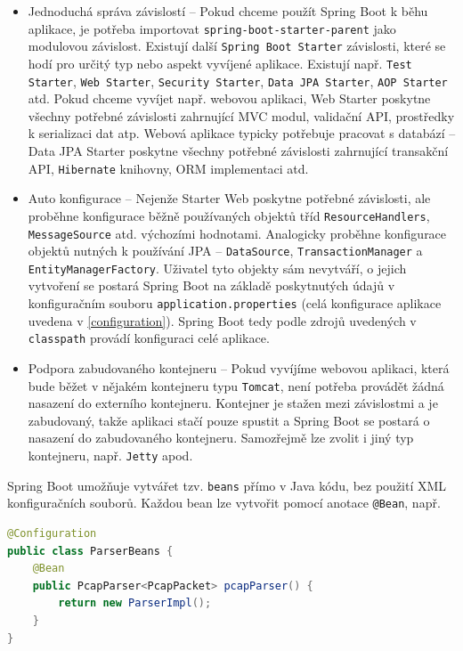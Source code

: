 \begin{itemize}
    \item Jednoduchá správa závislostí -- Pokud chceme použít Spring Boot k běhu aplikace, je potřeba importovat \texttt{spring-boot-starter-parent} jako modulovou závislost. Existují další \texttt{Spring Boot Starter} závislosti, které se hodí pro určitý typ nebo aspekt vyvíjené aplikace. Existují např. \texttt{Test Starter}, \texttt{Web Starter}, \texttt{Security Starter}, \texttt{Data JPA Starter}, \texttt{AOP Starter} atd. Pokud chceme vyvíjet např. webovou aplikaci, Web Starter poskytne všechny potřebné závislosti zahrnující MVC modul, validační API, prostředky k serializaci dat atp. Webová aplikace typicky potřebuje pracovat s databází -- Data JPA Starter poskytne všechny potřebné závislosti zahrnující transakční API, \texttt{Hibernate} knihovny, ORM implementaci atd.
    
    \item Auto konfigurace -- Nejenže Starter Web poskytne potřebné závislosti, ale proběhne konfigurace běžně používaných objektů tříd \texttt{ResourceHandlers}, \texttt{MessageSource} atd. výchozími hodnotami. Analogicky proběhne konfigurace objektů nutných k používání JPA -- \texttt{DataSource}, \texttt{TransactionManager} a \texttt{EntityManagerFactory}. Uživatel tyto objekty sám nevytváří, o jejich vytvoření se postará Spring Boot na základě poskytnutých údajů v konfiguračním souboru \texttt{application.properties} (celá konfigurace aplikace uvedena v \ref{configuration}). Spring Boot tedy podle zdrojů uvedených v \texttt{classpath} provádí konfiguraci celé aplikace.
    
    \item Podpora zabudovaného kontejneru -- Pokud vyvíjíme webovou aplikaci, která bude běžet v nějakém kontejneru typu \texttt{Tomcat}, není potřeba provádět žádná nasazení do externího kontejneru. Kontejner je stažen mezi závislostmi a je zabudovaný, takže aplikaci stačí pouze spustit a Spring Boot se postará o nasazení do zabudovaného kontejneru. Samozřejmě lze zvolit i jiný typ kontejneru, např. \texttt{Jetty} apod.
\end{itemize}

\noindent Spring Boot umožňuje vytvářet tzv. \texttt{beans} přímo v Java kódu, bez použití XML konfiguračních souborů. Každou bean lze vytvořit pomocí anotace \texttt{@Bean}, např.

\begin{lstlisting}[language=Java,frame=tb,basicstyle={\small\ttfamily}]
@Configuration
public class ParserBeans {
    @Bean
    public PcapParser<PcapPacket> pcapParser() {
        return new ParserImpl();
    }
}
\end{lstlisting}

